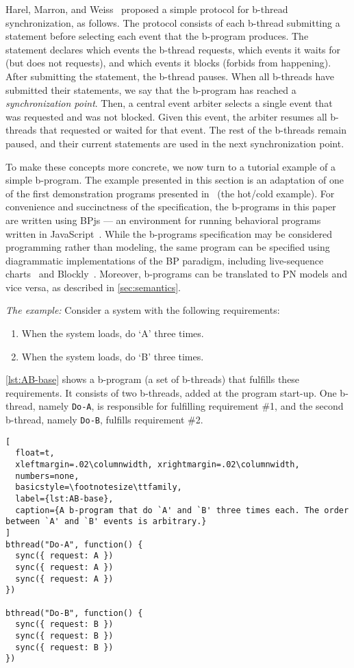 \documentclass[10pt,journal,compsoc]{IEEEtran}
\theoremstyle{definition}
\begin{document}
Harel, Marron, and Weiss~\cite{harel2010programming} proposed a simple protocol for b-thread synchronization, as follows. The protocol consists of each b-thread submitting a statement before selecting each event that the b-program produces. The statement declares which events the b-thread requests, which events it waits for (but does not requests), and which events it blocks (forbids from happening). After submitting the statement, the b-thread pauses. When all b-threads have submitted their statements, we say that the b-program has reached a \emph{synchronization point}. Then, a central event arbiter selects a single event that was requested and was not blocked. Given this event, the arbiter resumes all b-threads that requested or waited for that event. The rest of the b-threads remain paused, and their current statements are used in the next synchronization point. 

To make these concepts more concrete, we now turn to a tutorial example of a simple b-program. The example presented in this section is an adaptation of one of the first demonstration programs presented in~\cite{harel2010programming} (the hot/cold example).
For convenience and succinctness of the specification, the b-programs in this paper are written using BPjs --- an environment for running behavioral programs written in JavaScript~\cite{bar2018bpjs}. While the b-programs specification may be considered programming rather than modeling, the same program can be specified using diagrammatic implementations of the BP paradigm, including live-sequence charts~\cite{harel2003come} and Blockly~\cite{marron2012decentralized}. Moreover, b-programs can be translated to PN models and vice versa, as described in \autoref{sec:semantics}. 

\textit{The example:} Consider a system with the following requirements:
\begin{enumerate}
\item When the system loads, do `A' three times.
\item When the system loads, do `B' three times.
\end{enumerate}
\autoref{lst:AB-base} shows a b-program (a set of b-threads) that fulfills these requirements. It consists of two b-threads, added at the program start-up. One b-thread, namely \texttt{Do-A}, is responsible for fulfilling requirement \#1, and the second b-thread, namely \texttt{Do-B}, fulfills requirement \#2.

\begin{lstlisting}[
  float=t,
  xleftmargin=.02\columnwidth, xrightmargin=.02\columnwidth,
  numbers=none,
  basicstyle=\footnotesize\ttfamily,
  label={lst:AB-base},
  caption={A b-program that do `A' and `B' three times each. The order between `A' and `B' events is arbitrary.}
]
bthread("Do-A", function() {
  sync({ request: A })
  sync({ request: A })
  sync({ request: A })
})

bthread("Do-B", function() {
  sync({ request: B })
  sync({ request: B })
  sync({ request: B })
})
\end{lstlisting}
\end{document}
